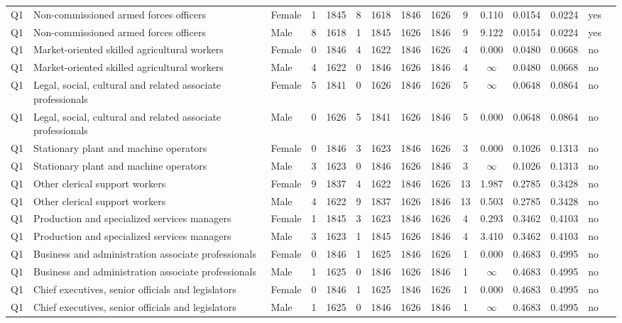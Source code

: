 \begin{longtable}{lllrcccccccccll}
Q1 & Non-commissioned armed forces officers & Female & 1 & 1845 & 8 & 1618 & 1846 & 1626 & 9 & 0.110 & 0.0154 & 0.0224 & yes \\
Q1 & Non-commissioned armed forces officers & Male & 8 & 1618 & 1 & 1845 & 1626 & 1846 & 9 & 9.122 & 0.0154 & 0.0224 & yes \\
Q1 & Market-oriented skilled agricultural workers & Female & 0 & 1846 & 4 & 1622 & 1846 & 1626 & 4 & 0.000 & 0.0480 & 0.0668 & no \\
Q1 & Market-oriented skilled agricultural workers & Male & 4 & 1622 & 0 & 1846 & 1626 & 1846 & 4 & $\infty$ & 0.0480 & 0.0668 & no \\
Q1 & Legal, social, cultural and related associate professionals & Female & 5 & 1841 & 0 & 1626 & 1846 & 1626 & 5 & $\infty$ & 0.0648 & 0.0864 & no \\
Q1 & Legal, social, cultural and related associate professionals & Male & 0 & 1626 & 5 & 1841 & 1626 & 1846 & 5 & 0.000 & 0.0648 & 0.0864 & no \\
Q1 & Stationary plant and machine operators & Female & 0 & 1846 & 3 & 1623 & 1846 & 1626 & 3 & 0.000 & 0.1026 & 0.1313 & no \\
Q1 & Stationary plant and machine operators & Male & 3 & 1623 & 0 & 1846 & 1626 & 1846 & 3 & $\infty$ & 0.1026 & 0.1313 & no \\
Q1 & Other clerical support workers & Female & 9 & 1837 & 4 & 1622 & 1846 & 1626 & 13 & 1.987 & 0.2785 & 0.3428 & no \\
Q1 & Other clerical support workers & Male & 4 & 1622 & 9 & 1837 & 1626 & 1846 & 13 & 0.503 & 0.2785 & 0.3428 & no \\
Q1 & Production and specialized services managers & Female & 1 & 1845 & 3 & 1623 & 1846 & 1626 & 4 & 0.293 & 0.3462 & 0.4103 & no \\
Q1 & Production and specialized services managers & Male & 3 & 1623 & 1 & 1845 & 1626 & 1846 & 4 & 3.410 & 0.3462 & 0.4103 & no \\
Q1 & Business and administration associate professionals & Female & 0 & 1846 & 1 & 1625 & 1846 & 1626 & 1 & 0.000 & 0.4683 & 0.4995 & no \\
Q1 & Business and administration associate professionals & Male & 1 & 1625 & 0 & 1846 & 1626 & 1846 & 1 & $\infty$ & 0.4683 & 0.4995 & no \\
Q1 & Chief executives, senior officials and legislators & Female & 0 & 1846 & 1 & 1625 & 1846 & 1626 & 1 & 0.000 & 0.4683 & 0.4995 & no \\
Q1 & Chief executives, senior officials and legislators & Male & 1 & 1625 & 0 & 1846 & 1626 & 1846 & 1 & $\infty$ & 0.4683 & 0.4995 & no \\

\end{longtable}
